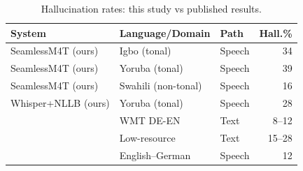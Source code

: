
\begin{table}[t]
\centering
\small
\caption{Hallucination rates: this study vs published results.}
\label{tab:p4_sota}
\begin{tabular}{lllr}
\toprule
\textbf{System} & \textbf{Language/Domain} & \textbf{Path} & \textbf{Hall.\%} \\
\midrule
SeamlessM4T (ours) & Igbo (tonal) & Speech & 34 \\
SeamlessM4T (ours) & Yoruba (tonal) & Speech & 39 \\
SeamlessM4T (ours) & Swahili (non-tonal) & Speech & 16 \\
Whisper+NLLB (ours) & Yoruba (tonal) & Speech & 28 \\
\midrule
\citet{li2021hallucination} & WMT DE-EN & Text & 8–12 \\
\citet{guerreiro2023hallucination} & Low-resource & Text & 15–28 \\
\citet{sperber2017cascade} & English–German & Speech & 12 \\
\bottomrule
\end{tabular}
\end{table}
